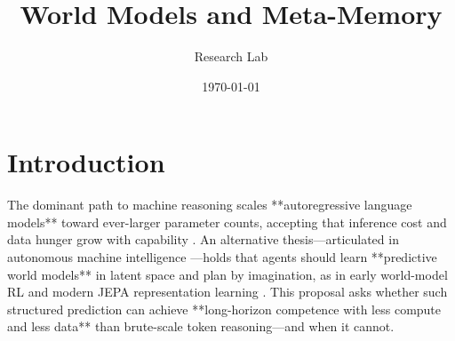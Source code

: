 \documentclass{article}
\title{World Models and Meta-Memory}
\author{Research Lab}
\date{\today}
\begin{document}
\maketitle


\section{Introduction}

The dominant path to machine reasoning scales **autoregressive language models** toward ever-larger parameter counts, accepting that inference cost and data hunger grow with capability \cite{s2_90abbc2cf38462b954ae1b772fac9532e2ccd8b0}. An alternative thesis—articulated in autonomous machine intelligence \cite{s2_775f42ed458b8c5b0f2094ea4ff5b64c557b1a34}—holds that agents should learn **predictive world models** in latent space and plan by imagination, as in early world-model RL \cite{s2_ff332c21562c87cab5891d495b7d0956f2d9228b} and modern JEPA representation learning \cite{s2_ee57e4d7a125f4ca8916284a857c3760d7d378d3}. This proposal asks whether such structured prediction can achieve **long-horizon competence with less compute and less data** than brute-scale token reasoning—and when it cannot.



\end{document}
